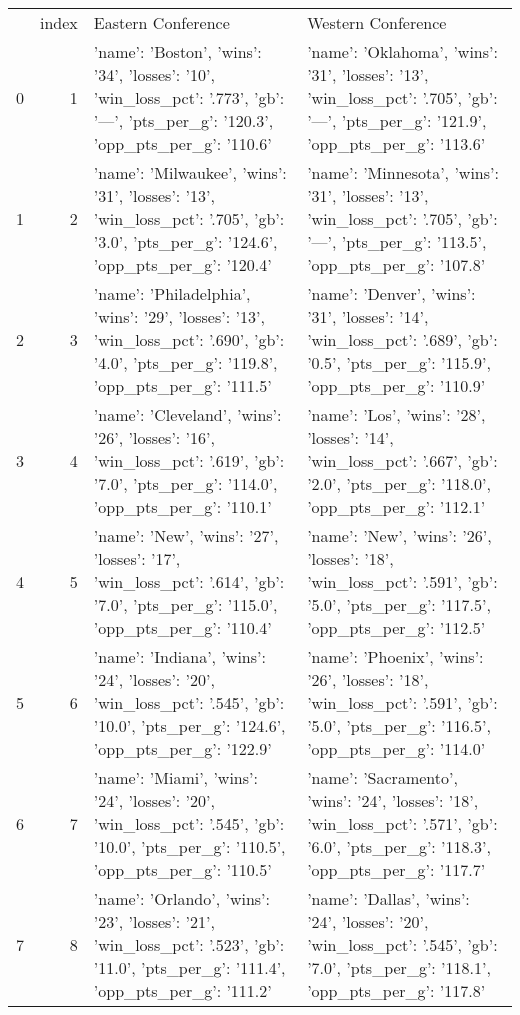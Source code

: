 \begin{tabular}{lrll}
 & index & Eastern Conference & Western Conference \\
0 & 1 & {'name': 'Boston', 'wins': '34', 'losses': '10', 'win_loss_pct': '.773', 'gb': '—', 'pts_per_g': '120.3', 'opp_pts_per_g': '110.6'} & {'name': 'Oklahoma', 'wins': '31', 'losses': '13', 'win_loss_pct': '.705', 'gb': '—', 'pts_per_g': '121.9', 'opp_pts_per_g': '113.6'} \\
1 & 2 & {'name': 'Milwaukee', 'wins': '31', 'losses': '13', 'win_loss_pct': '.705', 'gb': '3.0', 'pts_per_g': '124.6', 'opp_pts_per_g': '120.4'} & {'name': 'Minnesota', 'wins': '31', 'losses': '13', 'win_loss_pct': '.705', 'gb': '—', 'pts_per_g': '113.5', 'opp_pts_per_g': '107.8'} \\
2 & 3 & {'name': 'Philadelphia', 'wins': '29', 'losses': '13', 'win_loss_pct': '.690', 'gb': '4.0', 'pts_per_g': '119.8', 'opp_pts_per_g': '111.5'} & {'name': 'Denver', 'wins': '31', 'losses': '14', 'win_loss_pct': '.689', 'gb': '0.5', 'pts_per_g': '115.9', 'opp_pts_per_g': '110.9'} \\
3 & 4 & {'name': 'Cleveland', 'wins': '26', 'losses': '16', 'win_loss_pct': '.619', 'gb': '7.0', 'pts_per_g': '114.0', 'opp_pts_per_g': '110.1'} & {'name': 'Los', 'wins': '28', 'losses': '14', 'win_loss_pct': '.667', 'gb': '2.0', 'pts_per_g': '118.0', 'opp_pts_per_g': '112.1'} \\
4 & 5 & {'name': 'New', 'wins': '27', 'losses': '17', 'win_loss_pct': '.614', 'gb': '7.0', 'pts_per_g': '115.0', 'opp_pts_per_g': '110.4'} & {'name': 'New', 'wins': '26', 'losses': '18', 'win_loss_pct': '.591', 'gb': '5.0', 'pts_per_g': '117.5', 'opp_pts_per_g': '112.5'} \\
5 & 6 & {'name': 'Indiana', 'wins': '24', 'losses': '20', 'win_loss_pct': '.545', 'gb': '10.0', 'pts_per_g': '124.6', 'opp_pts_per_g': '122.9'} & {'name': 'Phoenix', 'wins': '26', 'losses': '18', 'win_loss_pct': '.591', 'gb': '5.0', 'pts_per_g': '116.5', 'opp_pts_per_g': '114.0'} \\
6 & 7 & {'name': 'Miami', 'wins': '24', 'losses': '20', 'win_loss_pct': '.545', 'gb': '10.0', 'pts_per_g': '110.5', 'opp_pts_per_g': '110.5'} & {'name': 'Sacramento', 'wins': '24', 'losses': '18', 'win_loss_pct': '.571', 'gb': '6.0', 'pts_per_g': '118.3', 'opp_pts_per_g': '117.7'} \\
7 & 8 & {'name': 'Orlando', 'wins': '23', 'losses': '21', 'win_loss_pct': '.523', 'gb': '11.0', 'pts_per_g': '111.4', 'opp_pts_per_g': '111.2'} & {'name': 'Dallas', 'wins': '24', 'losses': '20', 'win_loss_pct': '.545', 'gb': '7.0', 'pts_per_g': '118.1', 'opp_pts_per_g': '117.8'} \\

\end{tabular}
